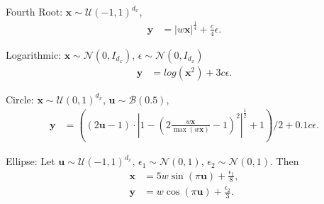 \documentclass[11pt]{article}
\providecommand{\mb}[1]{\boldsymbol{#1}}
\providecommand{\mc}[1]{\mathcal{#1}}
\begin{document}
\begin{compactenum}
\item Fourth Root: $\mb{x} \sim \mc{U}(-1,1)^{d_{x}}$,
\begin{align*}
\mb{y}&=|w\mb{x}|^\frac{1}{4}+\frac{c}{4}\epsilon.
\end{align*}
\item Logarithmic: $\mb{x} \sim \mc{N}(0, I_{d_{x}})$, $\epsilon \sim \mc{N}(0, I_{d_{x}})$
\begin{align*}
\mb{y}&=log(\mb{x}^2)+3c\epsilon.
\end{align*}
\item Circle: $\mb{x} \sim \mc{U}(0,1)^{d_{x}}$, $\mb{u} \sim \mc{B}(0.5)$,
\begin{align*}
\mb{y}&=((2\mb{u}-1) \cdot |1-(2\frac{w\mb{x}}{\max(w\mb{x})}-1)^2|^{\frac{1}{2}}+1)/2+0.1c\epsilon.
\end{align*}
\item Ellipse: Let $\mb{u} \sim \mc{U}(-1,1)^{d_{x}}$, $\epsilon_{1} \sim \mc{N}(0,1)$, $\epsilon_{2} \sim \mc{N}(0,1)$. Then
\begin{align*}
\mb{x}&=5w\sin(\pi \mb{u})+\frac{\epsilon_{1}}{8},\\
\mb{y}&=w\cos(\pi \mb{u})+\frac{\epsilon_{2}}{3}.
\end{align*}


\end{compactenum}
\end{document}
